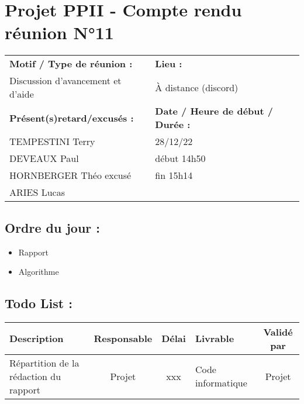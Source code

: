 \documentclass{article}
\begin{document}
\section*{Projet PPII - Compte rendu réunion N°11}
\begin{tabular}{|p{7cm}|p{6cm}|}
    \hline
    \textbf{Motif / Type de réunion :}
    & \textbf{Lieu :}
    \\
    Discussion d'avancement et d'aide
    & 
    À distance (discord)
    \\ \hline
    \textbf{Présent(s)retard/excusés :}
    &
    \textbf{Date / Heure de début / Durée :}
    \\ 
    TEMPESTINI Terry &  28/12/22\\  
    DEVEAUX Paul & début 14h50\\
    HORNBERGER Théo excusé & fin 15h14\\
    ARIES Lucas & 
    \\ \hline
\end{tabular}

\subsection*{Ordre du jour :}
\begin{itemize}
    \item{Rapport}
    \item{Algorithme}
\end{itemize}

\subsection*{Todo List :}
\begin{tabular}{|p{3.5cm}|c|c|p{4.5cm}|c|}
    \hline 
    Description & Responsable & Délai & Livrable & Validé par 
    \\ \hline
    Répartition de la rédaction du rapport & Projet & xxx & Code informatique& Projet \\ \hline
\end{tabular}
\end{document}

